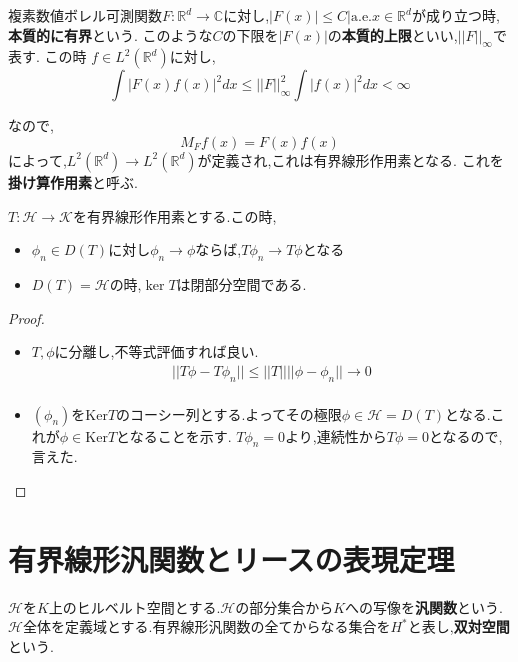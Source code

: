 \documentclass[uplatex]{jsbook}
\begin{document}
\begin{epl}
複素数値ボレル可測関数$F: \mathbb{R}^d \to \mathbb{C}$に対し,$\lvert F(x) \rvert \le C| \mathrm{a.e.} x \in \mathbb{R}^d$が成り立つ時,\textbf{本質的に有界}という.
このような$C$の下限を$|F(x)|$の\textbf{本質的上限}といい,$||F||_{\infty}$で表す.
この時 $f \in L^2(\mathbb{R}^d)$に対し,
\begin{equation*}
 \int |F(x)f(x)|^2 dx \le ||F||^2_{\infty} \int |f(x)|^2 dx < \infty
\end{equation*}
\end{epl}
なので,
\begin{equation*}
M_Ff(x) = F(x)f(x)
\end{equation*}
によって,$L^2(\mathbb{R}^d) \to L^2(\mathbb{R}^d)$が定義され,これは有界線形作用素となる.
これを\textbf{掛け算作用素}と呼ぶ.

\begin{prop}
$T: \mathcal{H} \to \mathcal{K}$を有界線形作用素とする.この時,
\begin{itemize}
  \item $\phi_n \in D(T)$に対し$\phi_n \to \phi$ならば,$T\phi_n \to T\phi$となる
  \item $D(T) = \mathcal{H}$の時,$\ker T$は閉部分空間である.
\end{itemize}
\end{prop}
\begin{proof}
  \begin{itemize}
    \item  $T, \phi$に分離し,不等式評価すれば良い.
\begin{align*}
    ||T\phi - T\phi_n|| \le ||T|| ||\phi - \phi_n|| \to 0 \\
\end{align*}
    \item 
    $(\phi_n)$を$\mathrm{Ker}T$のコーシー列とする.よってその極限$\phi \in \mathcal{H} =D(T)$となる.これが$\phi \in \mathrm{Ker}T$となることを示す.
    $T\phi_n = 0$より,連続性から$T\phi = 0$となるので,言えた.
  \end{itemize}
\end{proof}

\section{有界線形汎関数とリースの表現定理}
$\mathcal{H}$を$K$上のヒルベルト空間とする.$\mathcal{H}$の部分集合から$K$への写像を\textbf{汎関数}という.
$\mathcal{H}$全体を定義域とする.有界線形汎関数の全てからなる集合を$H^*$と表し,\textbf{双対空間}という.
\end{document}
